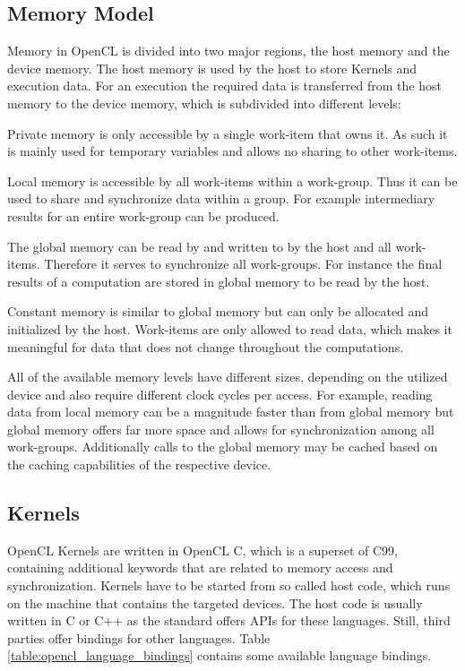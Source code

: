 \subsection*{Memory Model}

Memory in OpenCL is divided into two major regions, the host memory and the device memory. The host memory is used by the host to store Kernels and execution data. For an execution the required data is transferred from the host memory to the device memory, which is subdivided into different levels:

\begin{description}[align=left,leftmargin=0cm]
  \item [Private] Private memory is only accessible by a single work-item that owns it. As such it is mainly used for temporary variables and allows no sharing to other work-items.
  \item [Local] Local memory is accessible by all work-items within a work-group. Thus it can be used to share and synchronize data within a group. For example intermediary results for an entire work-group can be produced.
  \item [Global] The global memory can be read by and written to by the host and all work-items. Therefore it serves to synchronize all work-groups. For instance the final results of a computation are stored in global memory to be read by the host.
  \item [Constant] Constant memory is similar to global memory but can only be allocated and initialized by the host. Work-items are only allowed to read data, which makes it meaningful for data that does not change throughout the computations.
\end{description}

All of the available memory levels have different sizes, depending on the utilized device and also require different clock cycles per access. For example, reading data from local memory can be a magnitude faster than from global memory but global memory offers far more space and allows for synchronization among all work-groups. Additionally calls to the global memory may be cached based on the caching capabilities of the respective device.

\subsection*{Kernels}

OpenCL Kernels are written in OpenCL C, which is a superset of C99, containing additional keywords that are related to memory access and synchronization. Kernels have to be started from so called host code, which runs on the machine that contains the targeted devices. The host code is usually written in C or C++ as the standard offers APIs for these languages. Still, third parties offer bindings for other languages. Table \ref{table:opencl_language_bindings} contains some available language bindings.

